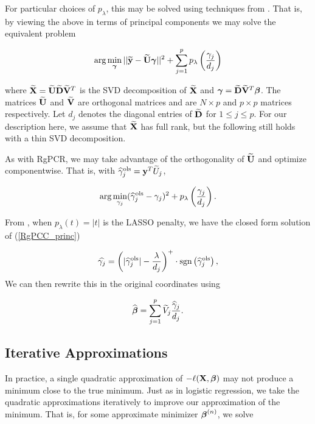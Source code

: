 \documentclass[main.tex]{subfiles}
\begin{document}
For particular choices of $p_{\lambda}$, this may be solved using techniques from \cite{langzou}. That is, by viewing the above in terms of principal components we may solve the equivalent problem

\begin{align}
	\text{arg} \min_{\boldsymbol \gamma} ||\widetilde{\mathbf{y}} - \widetilde{\mathbf{U}} \boldsymbol \gamma ||^2 + \sum_{j = 1}^p p_{\lambda} \left (\frac{\gamma_j}{d_j} \right )
\end{align}

where $\widetilde{\mathbf{X}} = \widetilde{\mathbf{U}} \widetilde{\mathbf{D}} \widetilde{\mathbf{V}}^T$ is the SVD decomposition of $\widetilde{\mathbf{X}}$ and $\boldsymbol \gamma = \widetilde{\mathbf{D}} \widetilde{\mathbf{V}}^T \boldsymbol \beta$. The matrices $\widetilde{\mathbf{U}}$ and $\widetilde{\mathbf{V}}$ are orthogonal matrices and are $N \times p$ and $p \times p$ matrices respectively. Let $d_j$ denotes the diagonal entries of $\widetilde{\mathbf{D}}$ for $1 \leq j \leq p$. For our description here, we assume that $\widetilde{\mathbf{X}}$ has full rank, but the following still holds with a thin SVD decomposition.

As with RgPCR, we may take advantage of the orthogonality of $\widetilde{\mathbf{U}}$ and optimize componentwise. That is, with $\widehat{\gamma}^{\text{ols}}_j = \mathbf{y}^T \widetilde{U}_j$,

\begin{align}
	 \text{arg} \min_{\gamma_j} (\widehat{\gamma}_j^{\text{ols}} - \gamma_j)^2 + p_{\lambda} \left (\frac{\gamma_j}{d_j} \right ). \label{RgPCC_princ}
\end{align}

From \cite{langzou}, when $p_\lambda(t) = |t|$ is the LASSO penalty, we have the closed form solution of (\ref{RgPCC_princ})

\begin{align}
	\widehat{\gamma_j} = \left ( |\widehat{\gamma}^{\text{ols}}_j| - \frac{\lambda}{d_j} \right )^+ \cdot \text{sgn} \left ( \widehat{\gamma}^{\text{ols}}_j \right ),
\end{align}
We can then rewrite this in the original coordinates using

\begin{align}
	\widehat{\boldsymbol \beta} = \sum_{j = 1}^p \widetilde{V}_j \frac{\widehat{\gamma}_j}{d_j}.
\end{align}

\subsection{Iterative Approximations}

In practice, a single quadratic approximation of $- \ell(\mathbf{X}, \boldsymbol \beta)$ may not produce a minimum close to the true minimum. Just as in logistic regression, we take the quadratic approximations iteratively to improve our approximation of the minimum. That is, for some approximate minimizer $\boldsymbol \beta^{(n)}$, we solve
\end{document}

